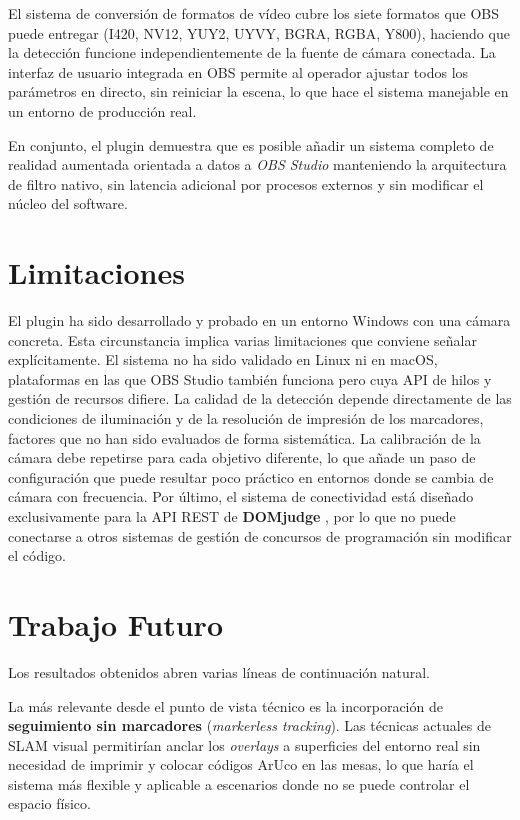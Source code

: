El sistema de conversión de formatos de vídeo cubre los siete formatos que OBS puede entregar (I420, NV12, YUY2, UYVY, BGRA, RGBA, Y800), haciendo que la detección funcione independientemente de la fuente de cámara conectada. La interfaz de usuario integrada en OBS permite al operador ajustar todos los parámetros en directo, sin reiniciar la escena, lo que hace el sistema manejable en un entorno de producción real.

En conjunto, el plugin demuestra que es posible añadir un sistema completo de realidad aumentada orientada a datos a \textit{OBS Studio} manteniendo la arquitectura de filtro nativo, sin latencia adicional por procesos externos y sin modificar el núcleo del software.

\section{Limitaciones}

El plugin ha sido desarrollado y probado en un entorno Windows con una cámara concreta. Esta circunstancia implica varias limitaciones que conviene señalar explícitamente. El sistema no ha sido validado en Linux ni en macOS, plataformas en las que OBS Studio también funciona pero cuya API de hilos y gestión de recursos difiere. La calidad de la detección depende directamente de las condiciones de iluminación y de la resolución de impresión de los marcadores, factores que no han sido evaluados de forma sistemática. La calibración de la cámara debe repetirse para cada objetivo diferente, lo que añade un paso de configuración que puede resultar poco práctico en entornos donde se cambia de cámara con frecuencia. Por último, el sistema de conectividad está diseñado exclusivamente para la API REST de \textbf{DOMjudge} \citep{DOMjudge}, por lo que no puede conectarse a otros sistemas de gestión de concursos de programación sin modificar el código.

\section{Trabajo Futuro}

Los resultados obtenidos abren varias líneas de continuación natural.

La más relevante desde el punto de vista técnico es la incorporación de \textbf{seguimiento sin marcadores} (\textit{markerless tracking}). Las técnicas actuales de SLAM visual \citep{MurArtal2015} permitirían anclar los \textit{overlays} a superficies del entorno real sin necesidad de imprimir y colocar códigos ArUco en las mesas, lo que haría el sistema más flexible y aplicable a escenarios donde no se puede controlar el espacio físico.


